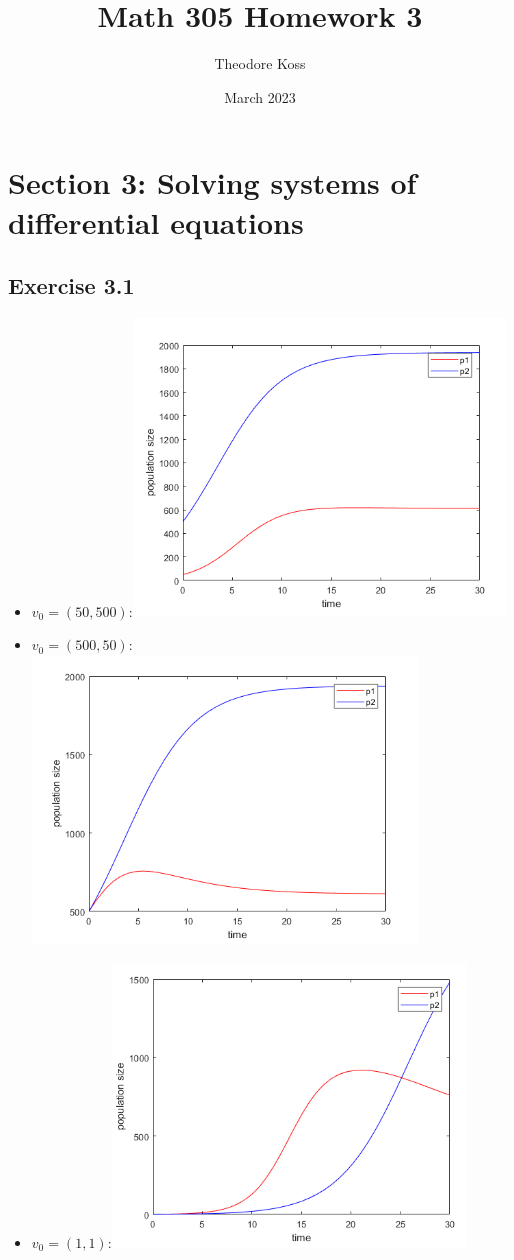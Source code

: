 \documentclass{article}
\title{Math 305 Homework 3}
\author{Theodore Koss}
\date{March 2023}
\begin{document}
\maketitle

\section*{Section 3: Solving systems of differential equations}
\subsection*{Exercise 3.1}
\begin{itemize}
    \item $v_0=(50,500)$:\newline \includegraphics[scale=.6]{Pictures/Pic6.png}
    \item $v_0=(500,50)$:\newline \includegraphics[scale=.6]{Pictures/Pic7.png}
    \item $v_0=(1,1)$:\newline \includegraphics[scale=.6]{Pictures/Pic8.png}

\end{itemize}
\end{document}
